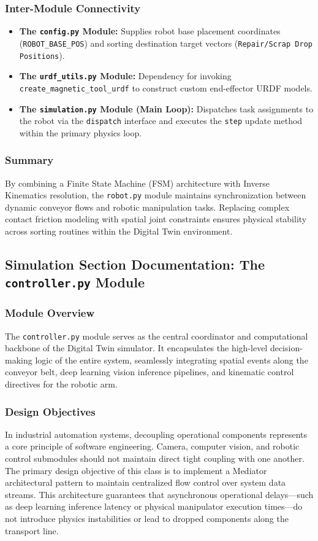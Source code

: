 \documentclass{article}
\begin{document}
\subsubsection{Inter-Module Connectivity}
\begin{itemize}
	\item \textbf{The \texttt{config.py} Module:} Supplies robot base placement coordinates (\texttt{ROBOT\_BASE\_POS}) and sorting destination target vectors (\texttt{Repair/Scrap Drop Positions}).
	\item \textbf{The \texttt{urdf\_utils.py} Module:} Dependency for invoking \texttt{create\_magnetic\_tool\_urdf} to construct custom end-effector URDF models.
	\item \textbf{The \texttt{simulation.py} Module (Main Loop):} Dispatches task assignments to the robot via the \texttt{dispatch} interface and executes the \texttt{step} update method within the primary physics loop.
\end{itemize}

\subsubsection{Summary}
By combining a Finite State Machine (FSM) architecture with Inverse Kinematics resolution, the \texttt{robot.py} module maintains synchronization between dynamic conveyor flows and robotic manipulation tasks. Replacing complex contact friction modeling with spatial joint constraints ensures physical stability across sorting routines within the Digital Twin environment.


\subsection{Simulation Section Documentation: The \texttt{controller.py} Module}

\subsubsection{Module Overview}
The \texttt{controller.py} module serves as the central coordinator and computational backbone of the Digital Twin simulator. It encapsulates the high-level decision-making logic of the entire system, seamlessly integrating spatial events along the conveyor belt, deep learning vision inference pipelines, and kinematic control directives for the robotic arm.

\subsubsection{Design Objectives}
In industrial automation systems, decoupling operational components represents a core principle of software engineering. Camera, computer vision, and robotic control submodules should not maintain direct tight coupling with one another. The primary design objective of this class is to implement a Mediator architectural pattern to maintain centralized flow control over system data streams. This architecture guarantees that asynchronous operational delays—such as deep learning inference latency or physical manipulator execution times—do not introduce physics instabilities or lead to dropped components along the transport line.
\end{document}
